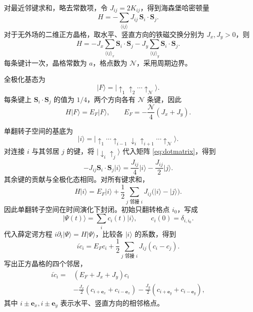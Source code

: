 \documentclass[UTF8,11pt,a4paper,fontset=fandol]{ctexart}
\newcommand{\ket}[1]{\lvert #1\rangle}
\begin{document}
对最近邻键求和，略去常数项，令 $J_{ij}=2K_{ij}$，得到海森堡哈密顿量
\begin{equation}
H=-\sum_{\langle ij\rangle}J_{ij}\,\mathbf S_i\cdot\mathbf S_j.
\label{eq:latticeH}
\end{equation}
对于无外场的二维正方晶格，取水平、竖直方向的铁磁交换分别为 $J_x,J_y>0$，则
\begin{equation}
H=-J_x\sum_{\langle ij\rangle_x}\mathbf S_i\cdot\mathbf S_j
-J_y\sum_{\langle ij\rangle_y}\mathbf S_i\cdot\mathbf S_j.
\label{eq:squareH}
\end{equation}
每条键计一次，晶格常数为 $a$，格点数为 $\mathcal N$，采用周期边界。

全极化基态为
\begin{equation}
\ket{F}=\ket{\uparrow_1\uparrow_2\cdots\uparrow_{\mathcal N}}.
\end{equation}
每条键上 $\mathbf S_i\cdot\mathbf S_j$ 的值为 $1/4$，两个方向各有 $\mathcal N$ 条键，因此
\begin{equation}
H\ket{F}=E_F\ket{F},\qquad
\boxed{E_F=-\frac{\mathcal N}{4}(J_x+J_y).}
\label{eq:EF}
\end{equation}

单翻转子空间的基底为
\begin{equation}
\ket{i}=
\ket{\uparrow_1\cdots\uparrow_{i-1}\downarrow_i
\uparrow_{i+1}\cdots\uparrow_{\mathcal N}}.
\label{eq:oneflip}
\end{equation}
对连接 $i$ 与其邻居 $j$ 的键，将 $\ket{\downarrow_i\uparrow_j}$ 代入矩阵 \eqref{eq:dotmatrix}，得到
\begin{equation}
-J_{ij}\mathbf S_i\cdot\mathbf S_j\ket{i}
=\frac{J_{ij}}4\ket{i}-\frac{J_{ij}}2\ket{j}.
\label{eq:bondaction}
\end{equation}
其余键的贡献与全极化态相同。对所有键求和，
\begin{equation}
H\ket{i}=E_F\ket{i}
+\frac12\sum_{j\text{ 邻接 }i}J_{ij}
\bigl(\ket{i}-\ket{j}\bigr).
\label{eq:Haction}
\end{equation}
因此单翻转子空间在时间演化下封闭。初始只翻转格点 $i_0$，写成
\begin{equation}
\ket{\Psi(t)}=\sum_i c_i(t)\ket{i},\qquad
c_i(0)=\delta_{i,i_0}.
\end{equation}
代入薛定谔方程 $i\partial_t\ket{\Psi}=H\ket{\Psi}$，比较各 $\ket{i}$ 的系数，得到
\begin{equation}
\boxed{
i\dot c_i
=E_Fc_i+\frac12\sum_{j\text{ 邻接 }i}J_{ij}(c_i-c_j).
}
\label{eq:EOMgeneral}
\end{equation}
写出正方晶格的四个邻居，
\begin{equation}
\boxed{
\begin{aligned}
i\dot c_i={}&(E_F+J_x+J_y)c_i\\
&-\frac{J_x}{2}
(c_{i+\mathbf e_x}+c_{i-\mathbf e_x})
-\frac{J_y}{2}
(c_{i+\mathbf e_y}+c_{i-\mathbf e_y}),
\end{aligned}
}
\label{eq:EOMsquare}
\end{equation}
其中 $i\pm\mathbf e_x,i\pm\mathbf e_y$ 表示水平、竖直方向的相邻格点。
\end{document}

